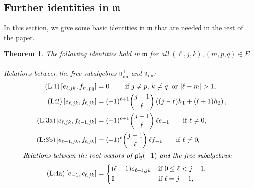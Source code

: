 \documentclass[11pt,letterpaper]{amsart}
\newcounter{thecounter}
\numberwithin{thecounter}{section}
\newtheorem{theorem}[thecounter]{Theorem}
\theoremstyle{definition}
\DeclareMathOperator{\gl}{\mathfrak{gl}}
\DeclareMathOperator{\im}{{im}}
\newcommand{\nimp}{{\mathfrak{n}_{\im}^+}}
\newcommand{\nimm}{{\mathfrak{n}_{\im}^-}}
\begin{document}
\subsection{Further identities in $\mathfrak{m}$}\label{SS-identities}
In this section, we give some basic identities in $\mathfrak{m}$ that are needed in the rest of the paper.
\begin{theorem}\label{T-identities-v2}
The following identities hold in  $\mathfrak{m}$ for all $(\ell,j,k), (m,p,q)\in E$. \\
Relations between the free subalgebras $\nimp$ and $\nimm$:
\begin{align*}
\tag{L:1}\label{L-ef0}
  \left[ e_{\ell,jk}, f_{m,pq}\right]&= 0   \qquad\text{ if $j\neq p$, $k\neq q$, or $| \ell- m|>1$}, \\
\tag{L:2}\label{L-efh} 
  \left[e_{\ell,jk}, f_{\ell,jk} \right] &
  =  (-1)^{\ell+1} \binom{j-1}{\ell}  \left( (j-\ell) h_1 +(\ell+1)h_2 \right), \\  %
\tag{L:3a}\label{L-efe-}
  \left[e_{\ell,jk}, f_{\ell-1,jk} \right]&= (-1)^{\ell+1}\binom{j-1}{\ell}\,\ell e_{-1} \qquad\text{if $\ell\ne 0$},\\
\tag{L:3b}\label{L-eff-}
  \left[e_{\ell-1,jk}, f_{\ell,jk} \right]&=(-1)^{\ell} \binom{j-1}{\ell}\,\ell f_{-1} \qquad\text{if $\ell\ne 0$},\\
\intertext{\it Relations between the root vectors of $\mathfrak{gl}_2(-1)$  and the free subalgebras:}
\tag{L:4a}\label{L-e-e}
  \left[e_{-1},  e_{\ell,jk} \right]&= \begin{cases}  (\ell+1)e_{\ell+1,jk} &\text{if $0\le\ell<j-1$,}\\ 0&\text{if $\ell=j-1$,}\end{cases} \\ 

\end{align*}
\end{theorem}
\end{document}

